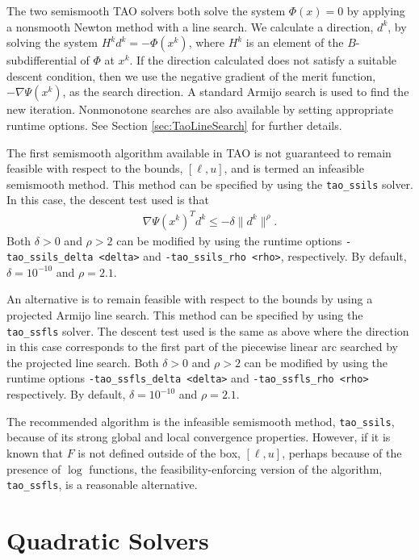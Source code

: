 \documentclass[]{book}
\begin{document}
The two semismooth TAO solvers both solve the system $\Phi(x) = 0$ by applying
a nonsmooth Newton method with a line search.  We calculate a direction, $d^k$,
by solving the system $H^kd^k = -\Phi(x^k)$, where $H^k$ is an element of the 
$B$-subdifferential \cite{qi.sun:nonsmooth} of $\Phi$ at $x^k$.  If the 
direction calculated does not satisfy a suitable descent condition, then 
we use the negative gradient of the merit function, $-\nabla \Psi(x^k)$, as 
the search direction.  A standard Armijo search \cite{armijo:minimization} is
used to find the new iteration.  Nonmonotone searches 
\cite{grippo.lampariello.ea:nonmonotone} are also available by setting 
appropriate runtime options.  See Section \ref{sec:TaoLineSearch} for further 
details.

The first semismooth algorithm available in TAO is not guaranteed to 
remain feasible with respect to the bounds, $[\ell, u]$, and is termed 
an infeasible semismooth method.  This method can be specified by using the 
{\tt tao\_ssils} solver.  In this case, the descent test used is 
that
\begin{eqnarray*}
\nabla \Psi(x^k)^Td^k \leq -\delta\| d^k \|^\rho.
\end{eqnarray*}
Both $\delta > 0$ and $\rho > 2$ can be modified by using the
runtime options {\tt -tao\_ssils\_delta <delta>} and 
{\tt -tao\_ssils\_rho <rho>}, respectively. By default, 
$\delta = 10^{-10}$ and $\rho = 2.1$.

An alternative is to remain feasible with respect to the bounds by using a 
projected Armijo line search.  This method can be specified by using the 
{\tt tao\_ssfls} solver.  The descent test used is the same as above 
where the direction in this case corresponds to the first part of the 
piecewise linear arc searched by the projected line search.  
Both $\delta > 0$ and $\rho > 2$ can be modified by using the runtime 
options  {\tt -tao\_ssfls\_delta <delta>} and {\tt -tao\_ssfls\_rho <rho>} 
respectively.  By default, $\delta = 10^{-10}$ and $\rho = 2.1$.

The recommended algorithm is the infeasible semismooth method,
{\tt tao\_ssils}, because of its strong global and local convergence 
properties.  However, if it is known that $F$ is not defined outside 
of the box, $[\ell,u]$, perhaps because of the presence of $\log$ functions,
the feasibility-enforcing version of the algorithm, {\tt tao\_ssfls}, is a 
reasonable alternative.

\section{Quadratic Solvers}
\end{document}
